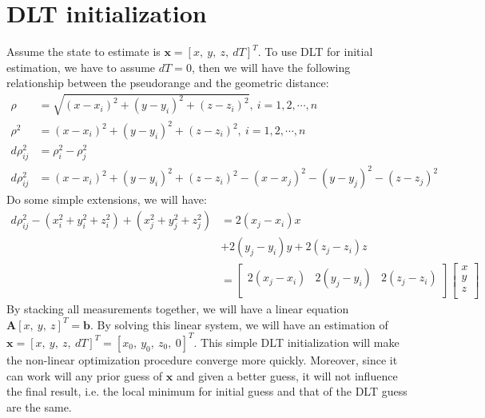 \documentclass[a4paper]{report}
\begin{document}
\section{DLT initialization}
Assume the state to estimate is $\mathbf{x} = [x,\ y,\ z,\ dT]^T$. To use DLT for initial estimation, we have to assume $dT = 0$, then we will have the following relationship between the pseudorange and the geometric distance:
\begin{align}
\rho &= \sqrt{(x-x_i)^2+(y-y_i)^2+(z-z_i)^2},\ i=1,2,\cdots,n \\
{\rho}^2 &= {(x-x_i)^2+(y-y_i)^2+(z-z_i)^2},\ i=1,2,\cdots,n \\
d\rho_{ij}^2 &= {\rho}^2_i - {\rho}^2_j \\
d\rho_{ij}^2 &={(x-x_i)^2+(y-y_i)^2+(z-z_i)^2}-{(x-x_j)^2-(y-y_j)^2-(z-z_j)^2}
\end{align}
Do some simple extensions, we will have:
\begin{align}
d\rho_{ij}^2 - (x_i^2+y_i^2+z_i^2) + (x_j^2+y_j^2+z_j^2) &= 2(x_j-x_i)x \nonumber \\
& + 2(y_j-y_i)y + 2(z_j-z_i)z \nonumber \\
&=\left[ 
\begin{matrix}
2(x_j-x_i) & 2(y_j-y_i) & 2(z_j-z_i) \\
\end{matrix}
\right]
\left[ 
\begin{matrix}
x \\ y \\ z \\
\end{matrix}
\right]
\end{align}
By stacking all measurements together, we will have a linear equation $\mathbf{A}[x,\ y,\ z]^T=\mathbf{b}$. By solving this linear system, we will have an estimation of $\mathbf{x} = [x,\ y,\ z,\ dT]^T = [x_0,\ y_0,\ z_0,\ 0]^T$. This simple DLT initialization will make the non-linear optimization procedure converge more quickly. Moreover, since it can work will any prior guess of $\mathbf{x}$ and given a better guess, it will not influence the final result, i.e. the local minimum for initial guess and that of the DLT guess are the same.
\end{document}
